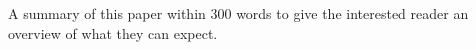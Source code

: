 A summary of this paper within 300 words to give the interested reader an overview of what they can expect.